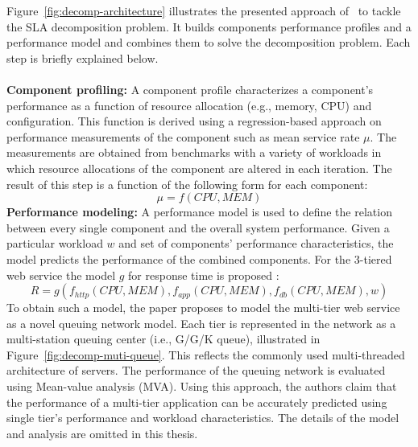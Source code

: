 Figure~\ref{fig:decomp-architecture} illustrates the presented approach of~\cite{chen2007sla} to tackle the SLA decomposition problem. It builds components performance profiles and a performance  model and combines them to solve the decomposition problem. Each step is briefly explained below. \\\\
\textbf{Component profiling:} A component profile characterizes a component's performance as a function of resource allocation (e.g., memory, CPU) and configuration. This function is derived using a regression-based approach on performance measurements of the component such as mean service rate $\mu$. The measurements are obtained from benchmarks with a variety of workloads in which resource allocations of the component are altered in each iteration. The result of this step is a function of the following form for each component:
\begin{equation}
 \mu = f(CPU,MEM)
\end{equation}
\noindent\textbf{Performance modeling:} A performance model is used to define the relation between every single component and the overall system performance. Given a particular workload $w$ and set of components' performance characteristics, the model predicts the performance of the combined components. For the 3-tiered web service the model $g$ for response time is proposed :
\begin{equation}
 R = g(f_{http}(CPU,MEM),f_{app}(CPU,MEM),f_{db}(CPU,MEM), w)
\end{equation}
To obtain such a model, the paper proposes to model the multi-tier web service as a novel queuing network model. Each tier is represented in the network as a multi-station queuing center (i.e., G/G/K queue), illustrated in Figure~\ref{fig:decomp-muti-queue}. This reflects the commonly used  multi-threaded architecture of servers. The performance of the queuing network is evaluated using Mean-value analysis (MVA). Using this approach, the authors claim that the performance of a multi-tier application can be accurately predicted using single tier's performance and workload characteristics.  The details of the model and analysis are omitted in this thesis.~\cite{chen2007sla}


